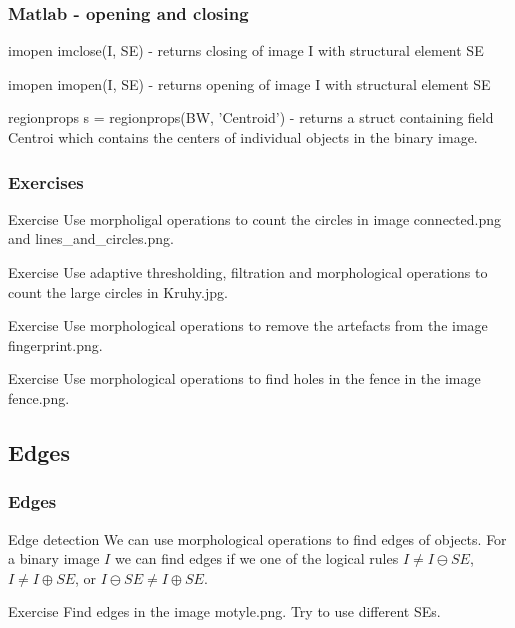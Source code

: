 \documentclass{beamer}
\begin{document}
\begin{frame}
\frametitle{Matlab - opening and closing}
  \begin{block}{imopen}
  imclose(I, SE) - returns closing of image I with structural element SE
  \end{block}
  
  \begin{block}{imopen}
  imopen(I, SE) - returns opening of image I with structural element SE
  \end{block}  
  
  \begin{block}{regionprops}
  s = regionprops(BW, 'Centroid') - returns a struct containing field Centroi which contains the centers of individual objects in the binary image.
  \end{block} 
\end{frame}

\begin{frame}
\frametitle{Exercises}
  \begin{block}{Exercise}
  Use morpholigal operations to count the circles in image connected.png and lines\_and\_circles.png.
  \end{block}  
  
  \begin{block}{Exercise}
  Use adaptive thresholding, filtration and morphological operations to count the large circles in Kruhy.jpg.
  \end{block}  
  
  \begin{block}{Exercise}
  Use morphological operations to remove the artefacts from the image fingerprint.png.
  \end{block}
  
  \begin{block}{Exercise}
  Use morphological operations to find holes in the fence in the image fence.png.
  \end{block}
\end{frame}


\subsection{Edges}

\begin{frame}
\frametitle{Edges}
  \begin{block}{Edge detection}
  We can use morphological operations to find edges of objects. For a binary image $I$ we can find edges if we one of the logical rules $I \neq I \ominus SE$, $I \neq I \oplus SE$, or $I \ominus SE \neq I \oplus SE$.
  \end{block}    
  
  \begin{block}{Exercise}
  Find edges in the image motyle.png. Try to use different SEs.
  \end{block}    
\end{frame}
\end{document}
